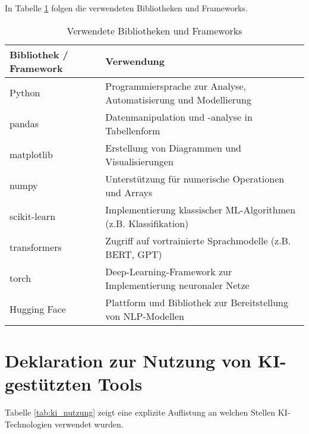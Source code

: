 In Tabelle \ref{tab:libs} folgen die verwendeten Bibliotheken und Frameworks.

\begin{table}[!ht]
    \renewcommand{\arraystretch}{1.3}
    \begin{tabular}{|p{3cm}|p{10.5cm}|}
        \hline 
        \rowcolor{lightgray} \textbf{Bibliothek / Framework} & \textbf{Verwendung} \\
        \hline
        Python & Programmiersprache zur Analyse, Automatisierung und Modellierung \\
        \hline
        pandas & Datenmanipulation und -analyse in Tabellenform \\
        \hline
        matplotlib & Erstellung von Diagrammen und Visualisierungen \\
        \hline
        numpy & Unterstützung für numerische Operationen und Arrays \\
        \hline
        scikit-learn & Implementierung klassischer ML-Algorithmen (z.B. Klassifikation) \\
        \hline
        transformers & Zugriff auf vortrainierte Sprachmodelle (z.B. BERT, GPT) \\
        \hline
        torch & Deep-Learning-Framework zur Implementierung neuronaler Netze \\
        \hline
        Hugging Face & Plattform und Bibliothek zur Bereitstellung von NLP-Modellen \\
        \hline
    \end{tabular}
    \caption{Verwendete Bibliotheken und Frameworks}
    \label{tab:libs}
\end{table}

\newpage

\section{Deklaration zur Nutzung von KI-gestützten Tools}

Tabelle \ref{tab:ki_nutzung} zeigt eine explizite Auflistung an welchen Stellen KI-Technologien verwendet wurden.

